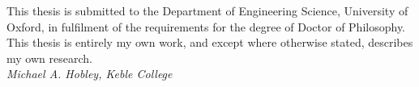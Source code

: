 \documentclass[../main.tex]{subfiles}
\begin{document}
\begin{originality}
    \centering
    This thesis is submitted to the Department of Engineering Science, University of Oxford, in fulfilment of the requirements for the degree
    of Doctor of Philosophy. This thesis is entirely my own work, and except where otherwise stated, describes my own research. \\\vspace{0.5cm}
    \textit{Michael A. Hobley, Keble College}
\end{originality}
\end{document}

